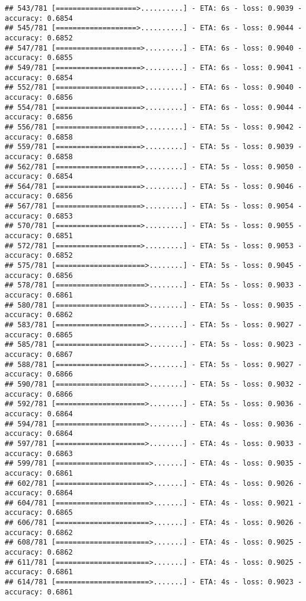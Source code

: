 \documentclass[
]{article}
\begin{document}
\begin{verbatim}
## 543/781 [===================>..........] - ETA: 6s - loss: 0.9039 - accuracy: 0.6854
## 545/781 [===================>..........] - ETA: 6s - loss: 0.9044 - accuracy: 0.6852
## 547/781 [====================>.........] - ETA: 6s - loss: 0.9040 - accuracy: 0.6855
## 549/781 [====================>.........] - ETA: 6s - loss: 0.9041 - accuracy: 0.6854
## 552/781 [====================>.........] - ETA: 6s - loss: 0.9040 - accuracy: 0.6856
## 554/781 [====================>.........] - ETA: 6s - loss: 0.9044 - accuracy: 0.6856
## 556/781 [====================>.........] - ETA: 5s - loss: 0.9042 - accuracy: 0.6858
## 559/781 [====================>.........] - ETA: 5s - loss: 0.9039 - accuracy: 0.6858
## 562/781 [====================>.........] - ETA: 5s - loss: 0.9050 - accuracy: 0.6854
## 564/781 [====================>.........] - ETA: 5s - loss: 0.9046 - accuracy: 0.6856
## 567/781 [====================>.........] - ETA: 5s - loss: 0.9054 - accuracy: 0.6853
## 570/781 [====================>.........] - ETA: 5s - loss: 0.9055 - accuracy: 0.6851
## 572/781 [====================>.........] - ETA: 5s - loss: 0.9053 - accuracy: 0.6852
## 575/781 [=====================>........] - ETA: 5s - loss: 0.9045 - accuracy: 0.6856
## 578/781 [=====================>........] - ETA: 5s - loss: 0.9033 - accuracy: 0.6861
## 580/781 [=====================>........] - ETA: 5s - loss: 0.9035 - accuracy: 0.6862
## 583/781 [=====================>........] - ETA: 5s - loss: 0.9027 - accuracy: 0.6865
## 585/781 [=====================>........] - ETA: 5s - loss: 0.9023 - accuracy: 0.6867
## 588/781 [=====================>........] - ETA: 5s - loss: 0.9027 - accuracy: 0.6866
## 590/781 [=====================>........] - ETA: 5s - loss: 0.9032 - accuracy: 0.6866
## 592/781 [=====================>........] - ETA: 5s - loss: 0.9036 - accuracy: 0.6864
## 594/781 [=====================>........] - ETA: 4s - loss: 0.9036 - accuracy: 0.6864
## 597/781 [=====================>........] - ETA: 4s - loss: 0.9033 - accuracy: 0.6863
## 599/781 [======================>.......] - ETA: 4s - loss: 0.9035 - accuracy: 0.6861
## 602/781 [======================>.......] - ETA: 4s - loss: 0.9026 - accuracy: 0.6864
## 604/781 [======================>.......] - ETA: 4s - loss: 0.9021 - accuracy: 0.6865
## 606/781 [======================>.......] - ETA: 4s - loss: 0.9026 - accuracy: 0.6862
## 608/781 [======================>.......] - ETA: 4s - loss: 0.9025 - accuracy: 0.6862
## 611/781 [======================>.......] - ETA: 4s - loss: 0.9025 - accuracy: 0.6861
## 614/781 [======================>.......] - ETA: 4s - loss: 0.9023 - accuracy: 0.6861

\end{verbatim}
\end{document}
